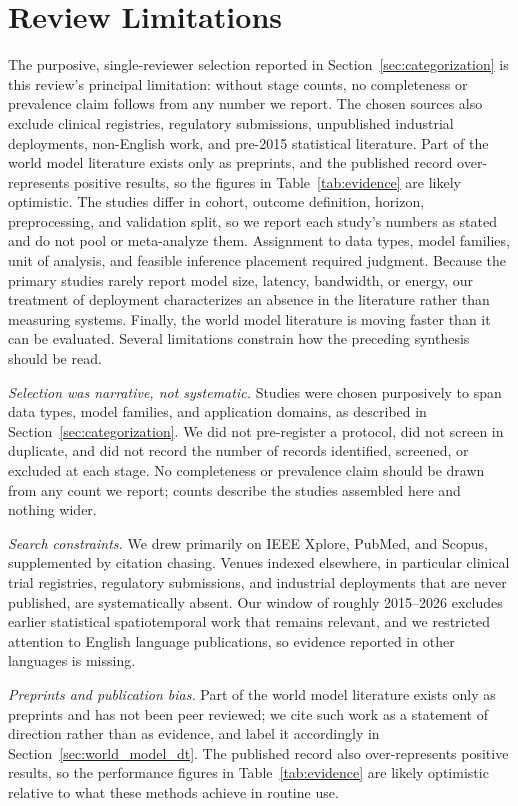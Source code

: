 \documentclass[journal]{IEEEtran}
\newif\ifsubmission
\begin{document}
\section{Review Limitations}
\label{sec:limitations}
\ifsubmission
The purposive, single-reviewer selection reported in Section~\ref{sec:categorization} is this review's principal limitation: without stage counts, no completeness or prevalence claim follows from any number we report. The chosen sources also exclude clinical registries, regulatory submissions, unpublished industrial deployments, non-English work, and pre-2015 statistical literature. Part of the world model literature exists only as preprints, and the published record over-represents positive results, so the figures in Table~\ref{tab:evidence} are likely optimistic. The studies differ in cohort, outcome definition, horizon, preprocessing, and validation split, so we report each study's numbers as stated and do not pool or meta-analyze them. Assignment to data types, model families, unit of analysis, and feasible inference placement required judgment. Because the primary studies rarely report model size, latency, bandwidth, or energy, our treatment of deployment characterizes an absence in the literature rather than measuring systems. Finally, the world model literature is moving faster than it can be evaluated.
\else
Several limitations constrain how the preceding synthesis should be read.

\emph{Selection was narrative, not systematic.} Studies were chosen purposively to span data types, model families, and application domains, as described in Section~\ref{sec:categorization}. We did not pre-register a protocol, did not screen in duplicate, and did not record the number of records identified, screened, or excluded at each stage. No completeness or prevalence claim should be drawn from any count we report; counts describe the studies assembled here and nothing wider.

\emph{Search constraints.} We drew primarily on IEEE Xplore, PubMed, and Scopus, supplemented by citation chasing. Venues indexed elsewhere, in particular clinical trial registries, regulatory submissions, and industrial deployments that are never published, are systematically absent. Our window of roughly 2015--2026 excludes earlier statistical spatiotemporal work that remains relevant, and we restricted attention to English language publications, so evidence reported in other languages is missing.

\emph{Preprints and publication bias.} Part of the world model literature exists only as preprints and has not been peer reviewed; we cite such work as a statement of direction rather than as evidence, and label it accordingly in Section~\ref{sec:world_model_dt}. The published record also over-represents positive results, so the performance figures in Table~\ref{tab:evidence} are likely optimistic relative to what these methods achieve in routine use.
\end{document}

